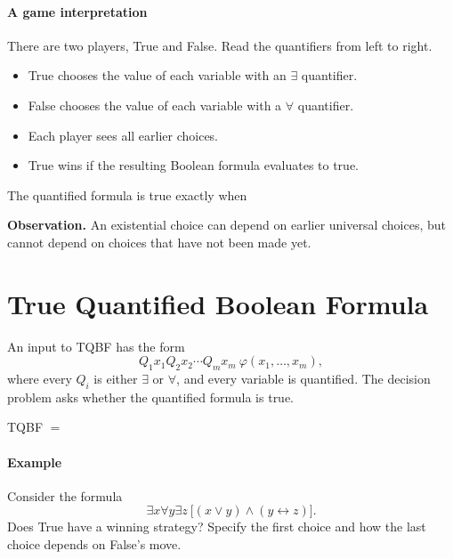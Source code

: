 \documentclass[11  pt]{article}
\begin{document}
\paragraph{A game interpretation}
There are two players, True and False. Read the quantifiers from left to right.
\begin{itemize}
    \item True chooses the value of each variable with an $\exists$ quantifier.
    \item False chooses the value of each variable with a $\forall$ quantifier.
    \item Each player sees all earlier choices.
    \item True wins if the resulting Boolean formula evaluates to true.
\end{itemize}

The quantified formula is true exactly when 

\vfill
\textbf{Observation.} An existential choice can depend on earlier universal choices, but cannot depend on choices that have not been made yet.

\newpage
\section{True Quantified Boolean Formula}
An input to \textsc{TQBF} has the form
\begin{equation*}
    Q_1x_1Q_2x_2\cdots Q_mx_m\ \varphi(x_1,\ldots,x_m),
\end{equation*}
where every $Q_i$ is either $\exists$ or $\forall$, and every variable is quantified. The decision problem asks whether the quantified formula is true.

\begin{center}
    \textsc{TQBF} $=\phantom{\{\langle\Phi\rangle:\Phi\text{ is a true quantified Boolean formula}\}}$
\end{center}

\paragraph{Example}
Consider the formula
\begin{equation*}
    \exists x\forall y\exists z\ \big[(x\lor y)\land(y\leftrightarrow z)\big].
\end{equation*}
Does True have a winning strategy? Specify the first choice and how the last choice depends on False's move.
\vs{2cm}
\end{document}
